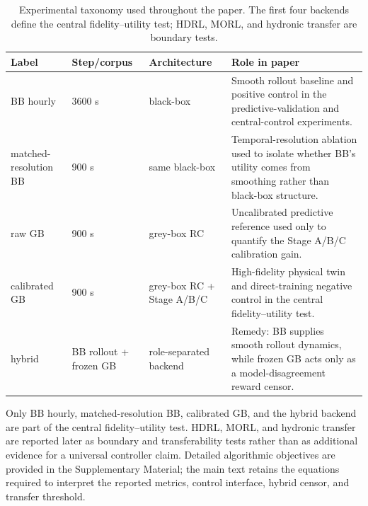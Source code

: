 \begin{table}[H]
\centering
\caption{Experimental taxonomy used throughout the paper. The first four backends define the central fidelity--utility test; HDRL, MORL, and hydronic transfer are boundary tests.}
\label{tab:taxonomy}
\small
\begin{tabularx}{\linewidth}{@{}p{20mm}p{18mm}p{32mm}X@{}}
\toprule
Label & Step/corpus & Architecture & Role in paper \\
\midrule
BB hourly & 3600 s & black-box & Smooth rollout baseline and positive control in the predictive-validation and central-control experiments. \\
matched-resolution BB & 900 s & same black-box & Temporal-resolution ablation used to isolate whether BB's utility comes from smoothing rather than black-box structure. \\
raw GB & 900 s & grey-box RC & Uncalibrated predictive reference used only to quantify the Stage A/B/C calibration gain. \\
calibrated GB & 900 s & grey-box RC + Stage A/B/C & High-fidelity physical twin and direct-training negative control in the central fidelity--utility test. \\
hybrid & BB rollout + frozen GB & role-separated backend & Remedy: BB supplies smooth rollout dynamics, while frozen GB acts only as a model-disagreement reward censor. \\
\bottomrule
\end{tabularx}
\end{table}
\FloatBarrier

Only BB hourly, matched-resolution BB, calibrated GB, and the hybrid backend are part of the central fidelity--utility test. HDRL, MORL, and hydronic transfer are reported later as boundary and transferability tests rather than as additional evidence for a universal controller claim. Detailed algorithmic objectives are provided in the Supplementary Material; the main text retains the equations required to interpret the reported metrics, control interface, hybrid censor, and transfer threshold.


